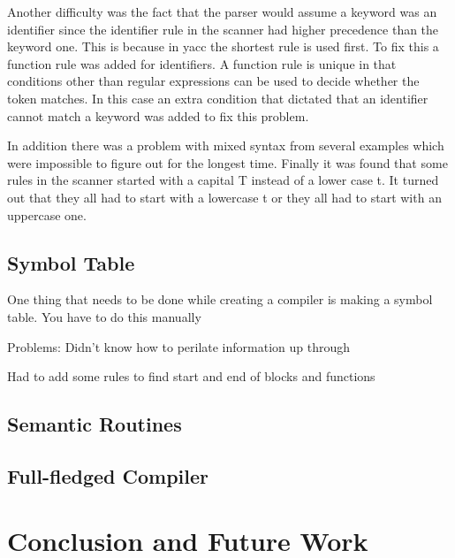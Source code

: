 \documentclass[12pt, oneside]{article}   	%
\begin{document}
 Another difficulty was the fact that the parser would assume a keyword was an
identifier since the identifier rule in the scanner had higher precedence than the keyword one. This is because in yacc the shortest rule is used first. To fix this a function rule was added for identifiers. A function rule is unique in that conditions other than regular expressions can be used to decide whether the token matches. In this case an extra condition that dictated that an identifier cannot match a keyword was added to fix this problem.

In addition there was a problem with mixed syntax from several examples which were impossible to figure out for the longest time. Finally it was found that some rules in the scanner started with a
capital T instead of a lower case t. It turned out that they all had to start with a lowercase t or they all had to start with an uppercase one.
\subsection{Symbol Table}
One thing that needs to be done while creating a compiler is making a symbol table. You have to do this manually

Problems: Didn't know how to perilate information up through

Had to add some rules to find start and end of blocks and functions

\subsection{Semantic Routines}
\subsection{Full-fledged Compiler}

\section{Conclusion and Future Work}

\end{document}
